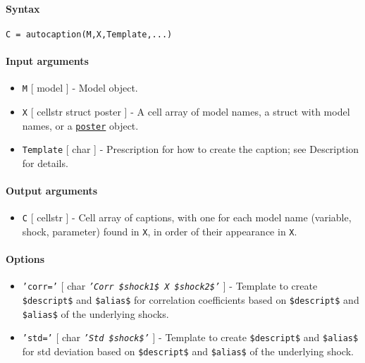 


	\paragraph{Syntax}

\begin{verbatim}
C = autocaption(M,X,Template,...)
\end{verbatim}

\paragraph{Input arguments}

\begin{itemize}
\item
  \texttt{M} {[} model {]} - Model object.
\item
  \texttt{X} {[} cellstr \textbar{} struct \textbar{} poster {]} - A
  cell array of model names, a struct with model names, or a
  \href{poster/Contents}{\texttt{poster}} object.
\item
  \texttt{Template} {[} char {]} - Prescription for how to create the
  caption; see Description for details.
\end{itemize}

\paragraph{Output arguments}

\begin{itemize}
\itemsep1pt\parskip0pt
\item
  \texttt{C} {[} cellstr {]} - Cell array of captions, with one for each
  model name (variable, shock, parameter) found in \texttt{X}, in order
  of their appearance in \texttt{X}.
\end{itemize}

\paragraph{Options}

\begin{itemize}
\item
  \texttt{'corr='} {[} char \textbar{}
  \emph{\texttt{'Corr \$shock1\$ X \$shock2\$'}} {]} - Template to
  create \texttt{\$descript\$} and \texttt{\$alias\$} for correlation
  coefficients based on \texttt{\$descript\$} and \texttt{\$alias\$} of
  the underlying shocks.
\item
  \texttt{'std='} {[} char \textbar{} \emph{\texttt{'Std \$shock\$'}}
  {]} - Template to create \texttt{\$descript\$} and \texttt{\$alias\$}
  for std deviation based on \texttt{\$descript\$} and
  \texttt{\$alias\$} of the underlying shock.
\end{itemize}

